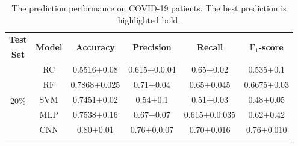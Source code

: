 \begin{table}[h]
    \centering
    \scriptsize
    \caption{The prediction performance on COVID-19 patients. The best prediction is highlighted bold.}\label{tab: experimetal results COVID}
    \begin{tabular}{c c cccc}
        \toprule
        {\bfseries Test} & \multirow{2}{*}{{\bfseries Model}} & \multirow{2}{*}{{\bfseries Accuracy}} & \multirow{2}{*}{{\bfseries Precision}} & \multirow{2}{*}{{\bfseries Recall}} & \multirow{2}{*}{{\bfseries $\text{F}_1$-score}}  \\ {\bfseries Set} & & & & & \\
        \midrule
    \multirow{7}{*}{20\%}
   
    & RC & \multicolumn{1}{c}{0.5516$\pm$0.08} & \multicolumn{1}{c}{0.615$\pm$0.0.04} & \multicolumn{1}{c}{0.65$\pm$0.02} & 0.535$\pm$0.1\\
    & RF & \multicolumn{1}{c}{0.7868$\pm$0.025} & \multicolumn{1}{c}{0.71$\pm$0.04} & \multicolumn{1}{c}{0.65$\pm$0.045} & 0.6675$\pm$0.03\\
   
    & SVM & \multicolumn{1}{c}{0.7451$\pm$0.02} & \multicolumn{1}{c}{0.54$\pm$0.1} & \multicolumn{1}{c}{0.51$\pm$0.03} & 0.48$\pm$0.05\\
    & MLP & \multicolumn{1}{c}{0.7538$\pm$0.16} & \multicolumn{1}{c}{0.67$\pm$0.07} & \multicolumn{1}{c}{0.615$\pm$0.0.035} & 0.62$\pm$0.42\\  
    & CNN & \multicolumn{1}{c}{0.80$\pm$0.01} & \multicolumn{1}{c}{0.76$\pm$0.0.07} & \multicolumn{1}{c}{0.70$\pm$0.016} & 0.76$\pm$0.010\\
    \midrule
    \multirow{7}{*}{25\%}
    
   

\end{tabular}
\end{table}
